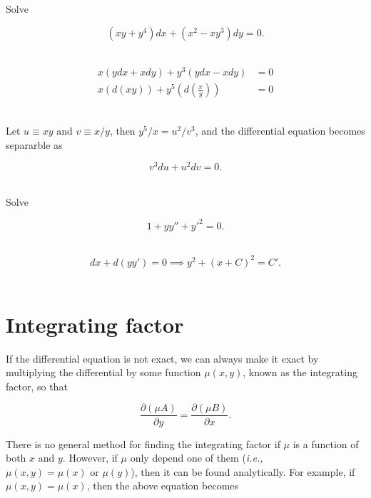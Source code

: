 \documentclass[english,a4paper,12pt]{report}
\begin{document}
{Solve 

\begin{equation}
    (xy+y^4)dx + (x^2- xy^3 )dy = 0.
\end{equation}~
}
{\begin{equation}
    \begin{aligned} 
        x(ydx+xdy)+y^3 (ydx-xdy) &= 0\\
        x(d(xy))+y^{5}\left(d\left( \frac{x}{y}  \right)\right) &=0 
    \end{aligned}  
\end{equation}~

Let \(u \equiv xy \text { and } v \equiv x /y\), then \(y^5 /x = u^2 /v^3     \), and the differential equation becomes separarble as

\begin{equation}
    v^3 du+u^2dv = 0. 
\end{equation}~
} 

{Solve 

\begin{equation}
    1+ y y'' + y'^2 = 0.
\end{equation}~
}
{\begin{equation}
    dx+d(y y') = 0 \implies y^2+(x+C)^2=C'.
\end{equation}~
} 






\section{Integrating factor}

If the differential equation is not exact, we can always make it exact by multiplying the differential by some function \(\mu (x,y)\), known as the integrating factor, so that

\begin{equation}
    \frac{\partial (\mu A)}{\partial y} = \frac{\partial (\mu B)}{\partial x}.  
\end{equation}

There is no general method for finding the integrating factor if \(\mu \) is a function of both \(x \text { and } y\). However, if \(\mu \) only depend one of them (\textit{i.e.,} \(\mu (x,y) = \mu (x) \text { or } \mu (y)\)), then it can be found analytically. For example, if \(\mu (x,y) = \mu (x)\), then the above equation becomes
\end{document}
